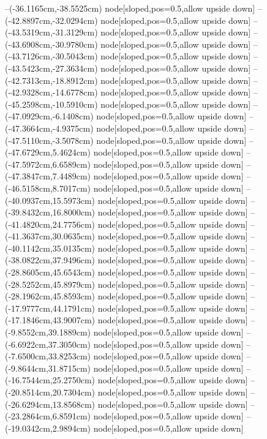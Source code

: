 --(-36.1165cm,-38.5525cm) node[sloped,pos=0.5,allow upside down]{\ArrowIn}
--(-42.8897cm,-32.0294cm) node[sloped,pos=0.5,allow upside down]{\ArrowIn}
--(-43.5319cm,-31.3129cm) node[sloped,pos=0.5,allow upside down]{\arrowIn}
--(-43.6908cm,-30.9780cm) node[sloped,pos=0.5,allow upside down]{\arrowIn}
--(-43.7126cm,-30.5043cm) node[sloped,pos=0.5,allow upside down]{\arrowIn}
--(-43.5423cm,-27.3634cm) node[sloped,pos=0.5,allow upside down]{\ArrowIn}
--(-42.7313cm,-18.8912cm) node[sloped,pos=0.5,allow upside down]{\ArrowIn}
--(-42.9328cm,-14.6778cm) node[sloped,pos=0.5,allow upside down]{\ArrowIn}
--(-45.2598cm,-10.5910cm) node[sloped,pos=0.5,allow upside down]{\ArrowIn}
--(-47.0929cm,-6.1408cm) node[sloped,pos=0.5,allow upside down]{\ArrowIn}
--(-47.3664cm,-4.9375cm) node[sloped,pos=0.5,allow upside down]{\ArrowIn}
--(-47.5110cm,-3.5078cm) node[sloped,pos=0.5,allow upside down]{\ArrowIn}
--(-47.6729cm,5.4624cm) node[sloped,pos=0.5,allow upside down]{\ArrowIn}
--(-47.5972cm,6.6589cm) node[sloped,pos=0.5,allow upside down]{\ArrowIn}
--(-47.3847cm,7.4489cm) node[sloped,pos=0.5,allow upside down]{\arrowIn}
--(-46.5158cm,8.7017cm) node[sloped,pos=0.5,allow upside down]{\ArrowIn}
--(-40.0937cm,15.5973cm) node[sloped,pos=0.5,allow upside down]{\ArrowIn}
--(-39.8432cm,16.8000cm) node[sloped,pos=0.5,allow upside down]{\ArrowIn}
--(-41.4820cm,24.7756cm) node[sloped,pos=0.5,allow upside down]{\ArrowIn}
--(-41.3637cm,30.0635cm) node[sloped,pos=0.5,allow upside down]{\ArrowIn}
--(-40.1142cm,35.0135cm) node[sloped,pos=0.5,allow upside down]{\ArrowIn}
--(-38.0822cm,37.9496cm) node[sloped,pos=0.5,allow upside down]{\ArrowIn}
--(-28.8605cm,45.6543cm) node[sloped,pos=0.5,allow upside down]{\ArrowIn}
--(-28.5252cm,45.8979cm) node[sloped,pos=0.5,allow upside down]{\arrowIn}
--(-28.1962cm,45.8593cm) node[sloped,pos=0.5,allow upside down]{\arrowIn}
--(-17.9777cm,44.1791cm) node[sloped,pos=0.5,allow upside down]{\ArrowIn}
--(-17.1846cm,43.9007cm) node[sloped,pos=0.5,allow upside down]{\arrowIn}
--(-9.8552cm,39.1889cm) node[sloped,pos=0.5,allow upside down]{\ArrowIn}
--(-6.6922cm,37.3050cm) node[sloped,pos=0.5,allow upside down]{\ArrowIn}
--(-7.6500cm,33.8253cm) node[sloped,pos=0.5,allow upside down]{\ArrowIn}
--(-9.8644cm,31.8715cm) node[sloped,pos=0.5,allow upside down]{\ArrowIn}
--(-16.7544cm,25.2750cm) node[sloped,pos=0.5,allow upside down]{\ArrowIn}
--(-20.8514cm,20.7304cm) node[sloped,pos=0.5,allow upside down]{\ArrowIn}
--(-26.6294cm,13.8568cm) node[sloped,pos=0.5,allow upside down]{\ArrowIn}
--(-23.2864cm,6.8591cm) node[sloped,pos=0.5,allow upside down]{\ArrowIn}
--(-19.0342cm,2.9894cm) node[sloped,pos=0.5,allow upside down]{\ArrowIn}
